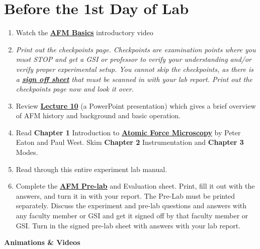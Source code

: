 \documentclass{../lab}
\begin{document}
\section{Before the 1st Day of Lab }

\begin{enumerate}
    \item Watch the \href{http://experimentationlab.berkeley.edu/sites/default/files/Introduction\%20Video\_2.mp4}{\textbf{AFM Basics}} introductory video

    \item \emph{Print out the checkpoints page. Checkpoints are examination points where you must STOP and get a GSI or professor to verify your understanding and/or verify proper experimental setup. You cannot skip the checkpoints, as there is a \href{http://experimentationlab.berkeley.edu/node/136}{\textbf{sign off sheet}} that must be scanned in with your lab report. Print out the checkpoints page now and look it over.}

    \item Review \href{http://experimentationlab.berkeley.edu/sites/default/files/AFMImages/Lecture\_10\_AFM.pdf}{\textbf{Lecture 10}} (a PowerPoint presentation) which gives a brief overview of AFM history and background and basic operation.

    \item Read \textbf{Chapter 1} Introduction to \href{http://experimentationlab.berkeley.edu/afm-book}{\textbf{Atomic Force Microscopy}} by Peter Eaton and Paul West. Skim \textbf{Chapter 2} Instrumentation and \textbf{Chapter 3} Modes.

    \item Read through this entire experiment lab manual.

    \item Complete the \href{http://experimentationlab.berkeley.edu/node/122}{\textbf{AFM Pre-lab}} and Evaluation sheet. Print, fill it out with the answers, and turn it in with your report. The Pre-Lab must be printed separately. Discuss the experiment and pre-lab questions and answers with any faculty member or GSI and get it signed off by that faculty member or GSI. Turn in the signed pre-lab sheet with answers with your lab report.

\end{enumerate}

\pagebreak

\textbf{Animations \& Videos}
\end{document}
